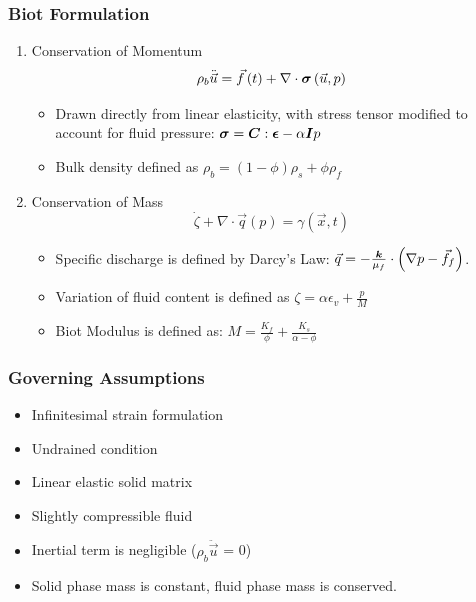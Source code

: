 \documentclass[aspectratio=169,hyperref=colorlinks]{beamer}
\begin{document}
\begin{frame}
  \frametitle{Biot Formulation}
  \begin{enumerate}
   \item Conservation of Momentum
    \begin{equation*}
      \rho_{b} \ddot{\vec{u}} = \vec{f}\left(t\right) + \nabla \cdot \bm{\sigma}\left(\vec{u},p\right)
    \end{equation*}
        {\tiny
        \begin{itemize}
          \item  Drawn directly from linear elasticity, with stress tensor modified to account for fluid pressure: $\bm{\sigma} = \bm{C}:\bm{\epsilon} - \alpha \bm{I} p$
          \item Bulk density defined as $\rho_{b} = \left(1 - \phi\right) \rho_{s} + \phi \rho_{f}$
        \end{itemize}}
    \item Conservation of Mass
        \begin{equation*}
          \dot{\zeta} + \nabla \cdot \vec{q}\left(p\right) = \gamma\left(\vec{x},t\right)
        \end{equation*}
          {\tiny
          \begin{itemize}
            \item Specific discharge is defined by Darcy's Law: $\vec{q} = -\frac{\bm{k}}{\mu_{f}} \cdot \left(\nabla p - \vec{f}_{f} \right)$.
            \item Variation of fluid content is defined as $\zeta = \alpha \epsilon_{v} + \frac{p}{M}$
            \item Biot Modulus is defined as: $M = \frac{K_{f}}{\phi} + \frac{K_{s}}{\alpha - \phi}$
          \end{itemize}}
  \end{enumerate}
\end{frame}

\begin{frame}
  \frametitle{Governing Assumptions}
  \begin{itemize}
    \item Infinitesimal strain formulation
    \item Undrained condition
    \item Linear elastic solid matrix
    \item Slightly compressible fluid
    \item Inertial term is negligible ($\rho_{b}\ddot{\vec{u}}$ = 0)
    \item Solid phase mass is constant, fluid phase mass is conserved.
  \end{itemize}
\end{frame}
\end{document}
